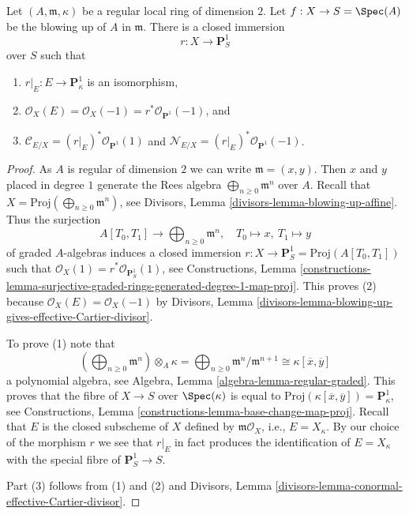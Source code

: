\begin{lemma}
\label{lemma-blowup}
Let $(A, \mathfrak m, \kappa)$ be a regular local ring of dimension $2$.
Let $f : X \to S = \Spec(A)$ be the blowing up of $A$ in $\mathfrak m$.
There is a closed immersion
$$
r : X \longrightarrow \mathbf{P}^1_S
$$
over $S$ such that
\begin{enumerate}
\item $r|_E : E \to \mathbf{P}^1_\kappa$ is an isomorphism,
\item $\mathcal{O}_X(E) = \mathcal{O}_X(-1) =
r^*\mathcal{O}_{\mathbf{P}^1}(-1)$, and
\item $\mathcal{C}_{E/X} = (r|_E)^*\mathcal{O}_{\mathbf{P}^1}(1)$ and
$\mathcal{N}_{E/X} = (r|_E)^*\mathcal{O}_{\mathbf{P}^1}(-1)$.
\end{enumerate}
\end{lemma}

\begin{proof}
As $A$ is regular of dimension $2$ we can write $\mathfrak m = (x, y)$.
Then $x$ and $y$ placed in degree $1$ generate the Rees algebra
$\bigoplus_{n \geq 0} \mathfrak m^n$ over $A$. Recall that
$X = \text{Proj}(\bigoplus_{n \geq 0} \mathfrak m^n)$, see
Divisors, Lemma \ref{divisors-lemma-blowing-up-affine}.
Thus the surjection
$$
A[T_0, T_1] \longrightarrow \bigoplus\nolimits_{n \geq 0} \mathfrak m^n,
\quad
T_0 \mapsto x,\ T_1 \mapsto y
$$
of graded $A$-algebras induces a closed immersion
$r : X \to \mathbf{P}^1_S = \text{Proj}(A[T_0, T_1])$
such that $\mathcal{O}_X(1) = r^*\mathcal{O}_{\mathbf{P}^1_S}(1)$, see
Constructions, Lemma
\ref{constructions-lemma-surjective-graded-rings-generated-degree-1-map-proj}.
This proves (2) because $\mathcal{O}_X(E) = \mathcal{O}_X(-1)$
by Divisors, Lemma
\ref{divisors-lemma-blowing-up-gives-effective-Cartier-divisor}.

\medskip\noindent
To prove (1) note that
$$
\left(\bigoplus\nolimits_{n \geq 0} \mathfrak m^n\right) \otimes_A \kappa =
\bigoplus\nolimits_{n \geq 0} \mathfrak m^n/\mathfrak m^{n + 1} \cong
\kappa[\overline{x}, \overline{y}]
$$
a polynomial algebra, see Algebra, Lemma \ref{algebra-lemma-regular-graded}.
This proves that the fibre of $X \to S$ over $\Spec(\kappa)$ is equal to
$\text{Proj}(\kappa[\overline{x}, \overline{y}]) = \mathbf{P}^1_\kappa$, see
Constructions, Lemma \ref{constructions-lemma-base-change-map-proj}.
Recall that $E$ is the closed subscheme of $X$ defined by
$\mathfrak m\mathcal{O}_X$, i.e., $E = X_\kappa$.
By our choice of the morphism $r$ we see that $r|_E$ in fact
produces the identification of $E = X_\kappa$ with the special
fibre of $\mathbf{P}^1_S \to S$.

\medskip\noindent
Part (3) follows from (1) and (2) and Divisors, Lemma
\ref{divisors-lemma-conormal-effective-Cartier-divisor}.
\end{proof}

